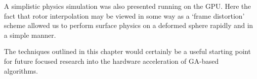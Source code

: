 A simplistic physics simulation was also presented running on the GPU. Here the
fact that rotor interpolation may be viewed in some way as a `frame distortion' scheme
allowed us to perform surface physics on a deformed sphere rapidly and in a simple manner.

The techniques outlined in this chapter would certainly be a useful starting point for
future focused research into the hardware acceleration of GA-based algorithms.

